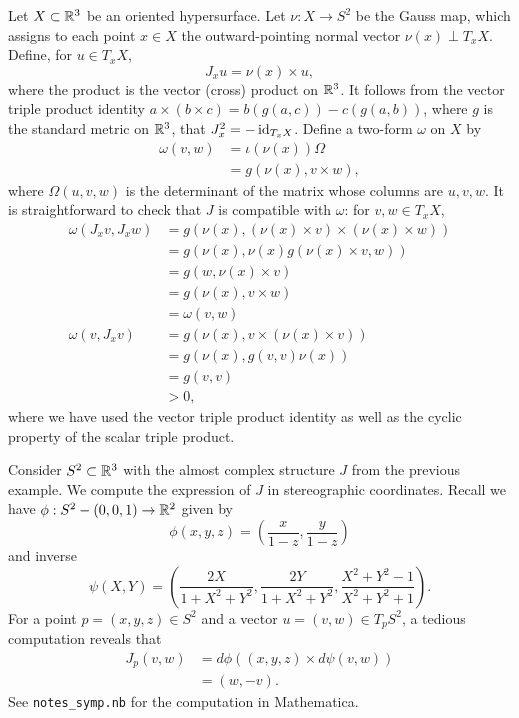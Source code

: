 \documentclass{amsart}
\begin{document}
\begin{example}
    Let $X\subset\mathbb{R}^3$ be an oriented hypersurface. Let $\nu:X\to S^2$ be the Gauss map,
    which assigns to each point $x\in X$ the outward-pointing normal vector $\nu(x)\perp T_xX$.
    Define, for $u\in T_xX$,
    \begin{equation*}
        J_xu = \nu(x)\times u,
    \end{equation*}
    where the product is the vector (cross) product on $\mathbb{R}^3$. It follows from the vector triple
    product identity $a\times (b\times c)=b(g(a,c))-c(g(a,b))$, where $g$ is the standard
    metric on $\mathbb{R}^3$, that $J_x^2=-\operatorname{id}_{T_xX}$. Define a two-form $\omega$ on $X$ by 
    \begin{align*}
        \omega(v,w) &= \iota(\nu(x))\Omega\\
        &= g(\nu(x),v\times w),
    \end{align*}
    where $\Omega(u,v,w)$ is the determinant of the matrix whose columns are $u,v,w$.
    It is straightforward to check that $J$ is compatible with $\omega$: for $v,w\in T_xX$,
    \begin{align*}
        \omega(J_xv,J_xw) &= g\left(\nu(x),(\nu(x)\times v)\times(\nu(x)\times w)\right)\\
        &= g\left( \nu(x),\nu(x) g(\nu(x)\times v,w) \right)\\
        &= g(w,\nu(x)\times v)\\
        &= g(\nu(x),v\times w)\\
        &= \omega(v,w)\\
        \omega(v, J_xv) &= g(\nu(x), v\times (\nu(x)\times v))\\
        &=g(\nu(x),g(v,v)\nu(x))\\
        &=g(v,v)\\
        &>0,
    \end{align*}
    where we have used the vector triple product identity as well as the cyclic property of
    the scalar triple product.
    \label{ex:vecprod}
\end{example}

\begin{example}
    Consider $S^2\subset\mathbb{R}^3$ with the almost complex structure $J$ from the previous example.
    We compute the expression of $J$ in stereographic coordinates. Recall we have $\phi:S^2-(0,0,1)\to\mathbb{R}^2$
    given by
    \begin{equation*}
        \phi(x,y,z) = \left( \frac{x}{1-z}, \frac{y}{1-z} \right)
    \end{equation*}
    and inverse
    \begin{equation*}
        \psi(X,Y) = \left( \frac{2X}{1+X^2+Y^2},\frac{2Y}{1+X^2+Y^2},\frac{X^2+Y^2-1}{X^2+Y^2+1} \right).
    \end{equation*}
    For a point $p=(x,y,z)\in S^2$ and a vector $u=(v,w)\in T_pS^2$, a tedious computation reveals that
    \begin{align*}
        J_p(v,w) &= d\phi\left((x,y,z)\times d\psi(v,w)\right)\\
        &= (w, -v).
    \end{align*}
    See \texttt{notes\_symp.nb} for the computation in Mathematica.
\end{example}
\end{document}

